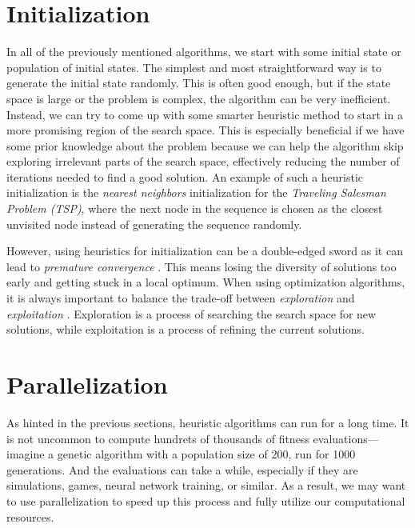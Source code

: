 \section{Initialization} \label{sec:initialization}

In all of the previously mentioned algorithms, we start with some initial state or population of initial states. The simplest and most straightforward way is to generate the initial state randomly. This is often good enough, but if the state space is large or the problem is complex, the algorithm can be very inefficient. Instead, we can try to come up with some smarter heuristic method to start in a more promising region of the search space. This is especially beneficial if we have some prior knowledge about the problem because we can help the algorithm skip exploring irrelevant parts of the search space, effectively reducing the number of iterations needed to find a good solution. An example of such a heuristic initialization is the \textit{nearest neighbors} initialization for the \textit{Traveling Salesman Problem (TSP)}, where the next node in the sequence is chosen as the closest unvisited node instead of generating the sequence randomly.

However, using heuristics for initialization can be a double-edged sword as it can lead to \textit{premature convergence} \cite{vanneschi2023lectures}. This means losing the diversity of solutions too early and getting stuck in a local optimum.
When using optimization algorithms, it is always important to balance the trade-off between \textit{exploration} and \textit{exploitation} \cite{luke2013essentials}. Exploration is a process of searching the search space for new solutions, while exploitation is a process of refining the current solutions.

\section{Parallelization} \label{sec:parallelization}

As hinted in the previous sections, heuristic algorithms can run for a long time. It is not uncommon to compute hundrets of thousands of fitness evaluations---imagine a genetic algorithm with a population size of 200, run for 1000 generations. And the evaluations can take a while, especially if they are simulations, games, neural network training, or similar. As a result, we may want to use parallelization to speed up this process and fully utilize our computational resources.

